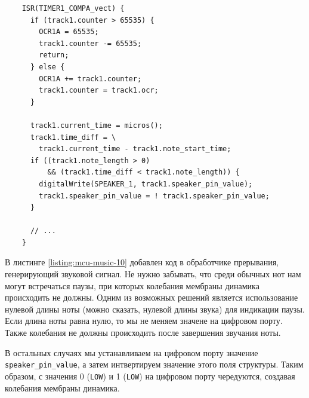 \documentclass[../sparc.tex]{subfiles}
\begin{document}
\begin{listing}[H]
  \begin{verbatim}
    ISR(TIMER1_COMPA_vect) {
      if (track1.counter > 65535) {
        OCR1A = 65535;
        track1.counter -= 65535;
        return;
      } else {
        OCR1A += track1.counter;
        track1.counter = track1.ocr;
      }

      track1.current_time = micros();
      track1.time_diff = \
        track1.current_time - track1.note_start_time;
      if ((track1.note_length > 0)
          && (track1.time_diff < track1.note_length)) {
        digitalWrite(SPEAKER_1, track1.speaker_pin_value);
        track1.speaker_pin_value = ! track1.speaker_pin_value;
      }

      // ...
    }
  \end{verbatim}
  \caption{Генерация звукового сигнала в обработчике прерывания.}
  \label{listing:mcu-music-10}
\end{listing}

В листинге \ref{listing:mcu-music-10} добавлен код в обработчике прерывания,
генерирующий звуковой сигнал.  Не нужно забывать, что среди обычных нот нам
могут встречаться паузы, при которых колебания мембраны динамика происходить не
должны.  Одним из возможных решений является использование нулевой длины ноты
(можно сказать, нулевой длины звука) для индикации паузы.  Если длина ноты равна
нулю, то мы не меняем значене на цифровом порту.  Также колебания не должны
происходить после завершения звучания ноты.

В остальных случаях мы устанавливаем на цифровом порту значение \\
\texttt{speaker_pin_value}, а затем интвертируем значение этого поля
структуры.  Таким образом, с значения 0 (\texttt{LOW}) и 1
(\texttt{LOW}) на цифровом порту чередуются, создавая колебания
мембраны динамика.
\end{document}
